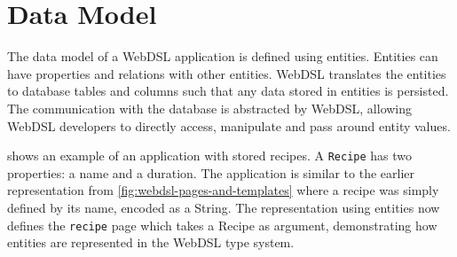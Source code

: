   \section{\label{sec:data-model}Data Model}

    The data model of a WebDSL application is defined using entities. Entities can have properties and relations with other entities. WebDSL translates the entities to database tables and columns such that any data stored in entities is persisted. The communication with the database is abstracted by WebDSL, allowing WebDSL developers to directly access, manipulate and pass around entity values.

     shows an example of an application with stored recipes. A \texttt{Recipe} has two properties: a name and a duration. The application is similar to the earlier representation from \cref{fig:webdsl-pages-and-templates} where a recipe was simply defined by its name, encoded as a String. The representation using entities now defines the \texttt{recipe} page which takes a Recipe as argument, demonstrating how entities are represented in the WebDSL type system.

